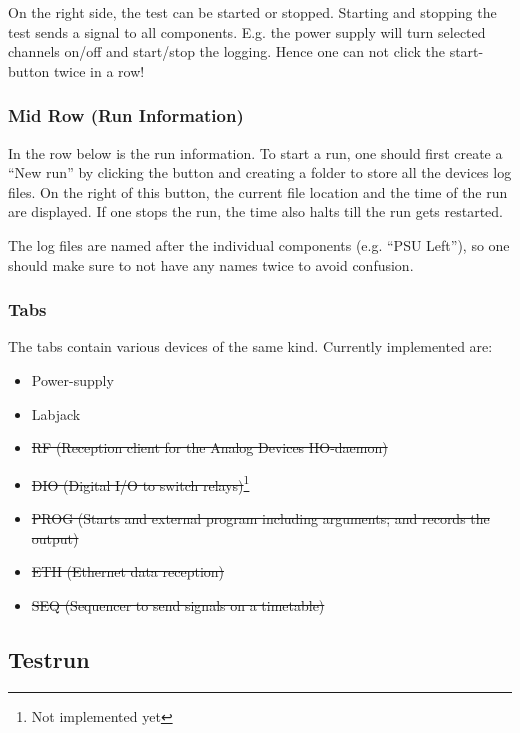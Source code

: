 \documentclass[10pt,a4paper]{article}
\begin{document}
	\bigbreak
	
	On the right side, the test can be started or stopped. Starting and stopping the test sends a signal to all components. E.g. the power supply will turn selected channels on/off and start/stop the logging. Hence one can not click the start-button twice in a row!
	
	\subsubsection{Mid Row (Run Information)}
	
	In the row below is the run information. To start a run, one should first create a \enquote{New run} by clicking the button and creating a folder to store all the devices log files. On the right of this button, the current file location and the time of the run are displayed. If one stops the run, the time also halts till the run gets restarted. 

	\bigbreak	
	
	The log files are named after the individual components (e.g. \enquote{PSU Left}), so one should make sure to not have any names twice to avoid confusion.
	
	\subsubsection{Tabs}
	
	The tabs contain various devices of the same kind. Currently implemented are:
	
	\begin{itemize}
\item Power-supply
\item Labjack
\item \sout{RF (Reception client for the Analog Devices IIO-daemon)}
\item \sout{DIO (Digital I/O to switch relays)}\footnote{Not implemented yet}
\item \sout{PROG (Starts and external program including arguments; and records the output)}
\item \sout{ETH (Ethernet data reception)}
\item \sout{SEQ (Sequencer to send signals on a timetable)}
	\end{itemize}		
	
	\subsection{Testrun}	
	
\end{document}
